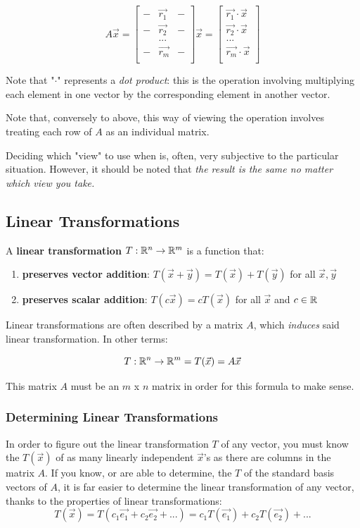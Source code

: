 \documentclass[12pt]{article}
\begin{document}
\[
A\Vec{x} = \begin{bmatrix}
- & \Vec{r_1} &-\\
- & \Vec{r_2} &-\\
 & ... &\\
- & \Vec{r_m} &-\\
\end{bmatrix}\Vec{x}=\begin{bmatrix}
\Vec{r_1} \cdot \Vec{x}\\
\Vec{r_2} \cdot \Vec{x}\\
...\\
\Vec{r_m} \cdot \Vec{x}\\
\end{bmatrix}
\]

Note that "$\cdot$" represents a \textit{dot product}: this is the operation involving multiplying each element in one vector by the corresponding element in another vector.

Note that, conversely to above, this way of viewing the operation involves treating each row of $A$ as an individual matrix.

Deciding which "view" to use when is, often, very subjective to the particular situation. However, it should be noted that \textit{the result is the same no matter which view you take.}

\subsection{Linear Transformations}
A \textbf{linear transformation} $T: \mathbb{R}^n \to \mathbb{R}^m$ is a function that:
\begin{enumerate}
    \item \textbf{preserves vector addition}: $T(\Vec{x}+\Vec{y}) = T(\Vec{x}) + T(\Vec{y})$ for all $\Vec{x}, \Vec{y}$
    \item \textbf{preserves scalar addition}: $T(c \Vec{x}) = c T(\Vec{x})$ for all $\Vec{x}$ and $c \in \mathbb{R}$
\end{enumerate}

Linear transformations are often described by a matrix $A$, which \textit{induces} said linear transformation. In other terms:

\[
T: \mathbb{R}^n \to \mathbb{R}^m = T(\Vec{x}) = A\Vec{x}
\]

This matrix $A$ must be an $m$ x $n$ matrix in order for this formula to make sense.

\subsubsection{Determining Linear Transformations}
In order to figure out the linear transformation $T$ of any vector, you must know the $T(\Vec{x})$ of as many linearly independent $\Vec{x}$'s as there are columns in the matrix $A$. If you know, or are able to determine, the $T$ of the standard basis vectors of $A$, it is far easier to determine the linear transformation of any vector, thanks to the properties of linear transformations:
\[
T(\Vec{x}) = T(c_1 \Vec{e_1} + c_2 \Vec{e_2} + ...) = c_1 T(\Vec{e_1}) + c_2 T(\Vec{e_2}) + ...
\]
\end{document}
